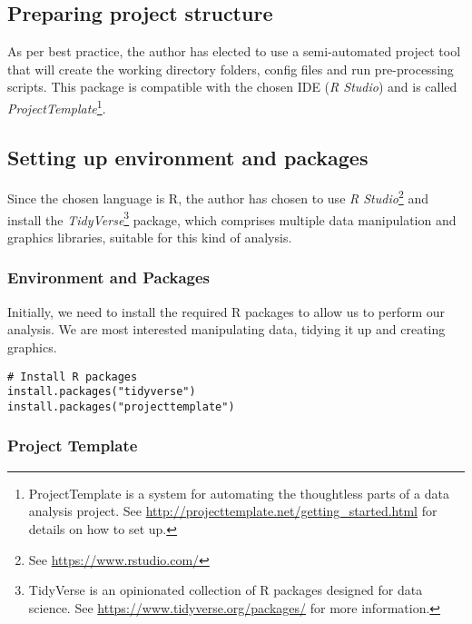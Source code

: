 \documentclass[
]{article}
\begin{document}
\hypertarget{preparing-project-structure}{%
\subsection{Preparing project
structure}\label{preparing-project-structure}}

As per best practice, the author has elected to use a semi-automated
project tool that will create the working directory folders, config
files and run pre-processing scripts. This package is compatible with
the chosen IDE (\emph{R Studio}) and is called
\emph{ProjectTemplate}\footnote{ProjectTemplate is a system for
  automating the thoughtless parts of a data analysis project. See
  \url{http://projecttemplate.net/getting_started.html} for details on
  how to set up.}.

\hypertarget{setting-up-environment-and-packages}{%
\subsection{Setting up environment and
packages}\label{setting-up-environment-and-packages}}

Since the chosen language is R, the author has chosen to use \emph{R
Studio}\footnote{See \url{https://www.rstudio.com/}} and install the
\emph{TidyVerse}\footnote{TidyVerse is an opinionated collection of R
  packages designed for data science. See
  \url{https://www.tidyverse.org/packages/} for more information.}
package, which comprises multiple data manipulation and graphics
libraries, suitable for this kind of analysis.

\hypertarget{environment-and-packages}{%
\subsubsection{Environment and
Packages}\label{environment-and-packages}}

Initially, we need to install the required R packages to allow us to
perform our analysis. We are most interested manipulating data, tidying
it up and creating graphics.

\begin{verbatim}
# Install R packages
install.packages("tidyverse")
install.packages("projecttemplate")
\end{verbatim}

\hypertarget{project-template}{%
\subsubsection{Project Template}\label{project-template}}
\end{document}
